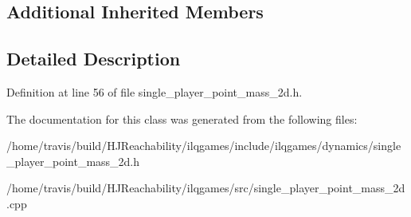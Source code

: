 \subsection*{Additional Inherited Members}


\subsection{Detailed Description}


Definition at line 56 of file single\+\_\+player\+\_\+point\+\_\+mass\+\_\+2d.\+h.



The documentation for this class was generated from the following files\+:\begin{DoxyCompactItemize}
\item 
/home/travis/build/\+H\+J\+Reachability/ilqgames/include/ilqgames/dynamics/single\+\_\+player\+\_\+point\+\_\+mass\+\_\+2d.\+h\item 
/home/travis/build/\+H\+J\+Reachability/ilqgames/src/single\+\_\+player\+\_\+point\+\_\+mass\+\_\+2d.\+cpp\end{DoxyCompactItemize}
